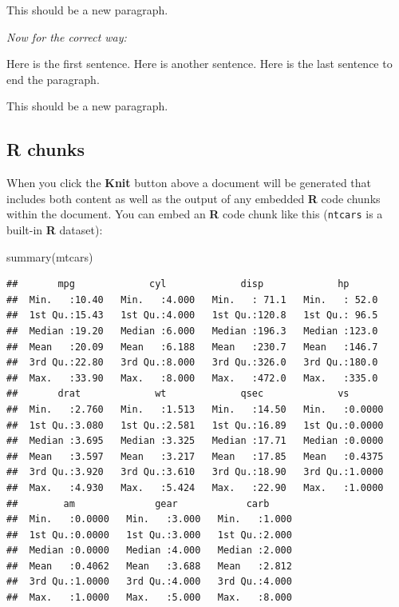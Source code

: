 \documentclass{article}
\newenvironment{Shaded}{\begin{snugshade}}{\end{snugshade}}
\newcommand{\FunctionTok}[1]{\textcolor[rgb]{0.00,0.00,0.00}{#1}}
\newcommand{\NormalTok}[1]{#1}
\begin{document}
This should be a new paragraph.

\emph{Now for the correct way:}

Here is the first sentence. Here is another sentence. Here is the last
sentence to end the paragraph.

This should be a new paragraph.

\hypertarget{r-chunks}{%
\subsection{R chunks}\label{r-chunks}}

When you click the \textbf{Knit} button above a document will be
generated that includes both content as well as the output of any
embedded \textbf{R} code chunks within the document. You can embed an
\textbf{R} code chunk like this (\texttt{ntcars} is a built-in
\textbf{R} dataset):

\begin{Shaded}
\begin{Highlighting}[]
\FunctionTok{summary}\NormalTok{(mtcars)}
\end{Highlighting}
\end{Shaded}

\begin{verbatim}
##       mpg             cyl             disp             hp       
##  Min.   :10.40   Min.   :4.000   Min.   : 71.1   Min.   : 52.0  
##  1st Qu.:15.43   1st Qu.:4.000   1st Qu.:120.8   1st Qu.: 96.5  
##  Median :19.20   Median :6.000   Median :196.3   Median :123.0  
##  Mean   :20.09   Mean   :6.188   Mean   :230.7   Mean   :146.7  
##  3rd Qu.:22.80   3rd Qu.:8.000   3rd Qu.:326.0   3rd Qu.:180.0  
##  Max.   :33.90   Max.   :8.000   Max.   :472.0   Max.   :335.0  
##       drat             wt             qsec             vs        
##  Min.   :2.760   Min.   :1.513   Min.   :14.50   Min.   :0.0000  
##  1st Qu.:3.080   1st Qu.:2.581   1st Qu.:16.89   1st Qu.:0.0000  
##  Median :3.695   Median :3.325   Median :17.71   Median :0.0000  
##  Mean   :3.597   Mean   :3.217   Mean   :17.85   Mean   :0.4375  
##  3rd Qu.:3.920   3rd Qu.:3.610   3rd Qu.:18.90   3rd Qu.:1.0000  
##  Max.   :4.930   Max.   :5.424   Max.   :22.90   Max.   :1.0000  
##        am              gear            carb      
##  Min.   :0.0000   Min.   :3.000   Min.   :1.000  
##  1st Qu.:0.0000   1st Qu.:3.000   1st Qu.:2.000  
##  Median :0.0000   Median :4.000   Median :2.000  
##  Mean   :0.4062   Mean   :3.688   Mean   :2.812  
##  3rd Qu.:1.0000   3rd Qu.:4.000   3rd Qu.:4.000  
##  Max.   :1.0000   Max.   :5.000   Max.   :8.000
\end{verbatim}
\end{document}
